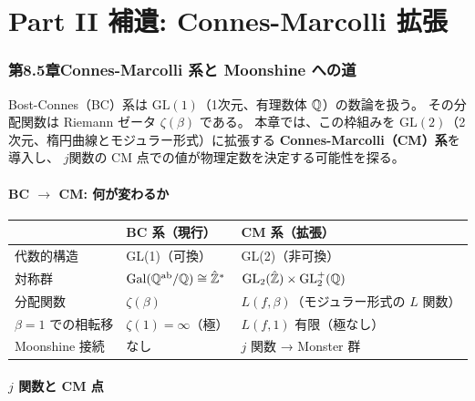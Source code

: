 
\part*{Part II 補遺: Connes-Marcolli 拡張}

\section*{第8.5章\quad Connes-Marcolli 系と Moonshine への道}

Bost-Connes（BC）系は $\mathrm{GL}(1)$（1次元、有理数体 $\mathbb{Q}$）の数論を扱う。
その分配関数は Riemann ゼータ $\zeta(\beta)$ である。
本章では、この枠組みを $\mathrm{GL}(2)$（2次元、楕円曲線とモジュラー形式）に拡張する
\textbf{Connes-Marcolli（CM）系}を導入し、
$j$関数の CM 点での値が物理定数を決定する可能性を探る。

\subsection{BC $\to$ CM: 何が変わるか}

\begin{center}
\begin{tabular}{lll}
\toprule
& BC 系（現行） & CM 系（拡張） \\
\midrule
代数的構造 & GL(1)（可換） & GL(2)（非可換） \\
対称群 & $\operatorname{Gal}(\mathbb{Q}^{\mathrm{ab}}/\mathbb{Q}) \cong \hat{\mathbb{Z}}^*$ &
  $\mathrm{GL}_2(\hat{\mathbb{Z}}) \times \mathrm{GL}_2^+(\mathbb{Q})$ \\
分配関数 & $\zeta(\beta)$ & $L(f, \beta)$（モジュラー形式の $L$ 関数） \\
$\beta = 1$ での相転移 & $\zeta(1) = \infty$（極） & $L(f, 1)$ 有限（極なし） \\
Moonshine 接続 & なし & $j$ 関数 → Monster 群 \\
\bottomrule
\end{tabular}
\end{center}

\subsection{$j$ 関数と CM 点}

